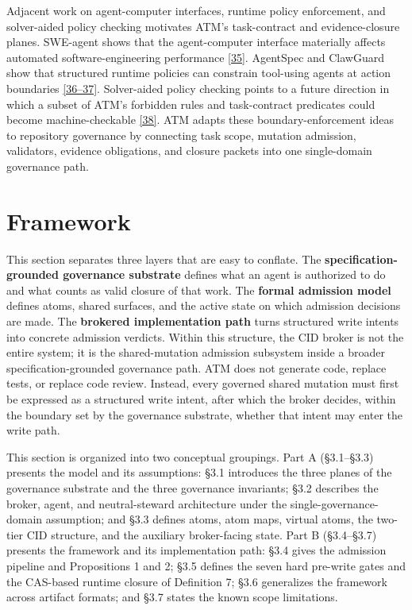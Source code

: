 \documentclass[9pt,letterpaper]{extarticle}
\begin{document}
Adjacent work on agent-computer interfaces, runtime policy enforcement, and solver-aided policy checking motivates ATM's task-contract and evidence-closure planes. SWE-agent shows that the agent-computer interface materially affects automated software-engineering performance \textcolor{atmLinkBlue}{\hyperlink{Item.71}{[35]}}. AgentSpec and ClawGuard show that structured runtime policies can constrain tool-using agents at action boundaries \textcolor{atmLinkBlue}{\hyperlink{Item.72}{[36--37]}}. Solver-aided policy checking points to a future direction in which a subset of ATM's forbidden rules and task-contract predicates could become machine-checkable \textcolor{atmLinkBlue}{\hyperlink{Item.74}{[38]}}. ATM adapts these boundary-enforcement ideas to repository governance by connecting task scope, mutation admission, validators, evidence obligations, and closure packets into one single-domain governance path.

\section{Framework}

This section separates three layers that are easy to conflate. The \textbf{specification-grounded governance substrate} defines what an agent is authorized to do and what counts as valid closure of that work. The \textbf{formal admission model} defines atoms, shared surfaces, and the active state on which admission decisions are made. The \textbf{brokered implementation path} turns structured write intents into concrete admission verdicts. Within this structure, the CID broker is not the entire system; it is the shared-mutation admission subsystem inside a broader specification-grounded governance path. ATM does not generate code, replace tests, or replace code review. Instead, every governed shared mutation must first be expressed as a structured write intent, after which the broker decides, within the boundary set by the governance substrate, whether that intent may enter the write path.

This section is organized into two conceptual groupings. Part A (§3.1--§3.3) presents the model and its assumptions: §3.1 introduces the three planes of the governance substrate and the three governance invariants; §3.2 describes the broker, agent, and neutral-steward architecture under the single-governance-domain assumption; and §3.3 defines atoms, atom maps, virtual atoms, the two-tier CID structure, and the auxiliary broker-facing state. Part B (§3.4--§3.7) presents the framework and its implementation path: §3.4 gives the admission pipeline and Propositions 1 and 2; §3.5 defines the seven hard pre-write gates and the CAS-based runtime closure of Definition 7; §3.6 generalizes the framework across artifact formats; and §3.7 states the known scope limitations.
\end{document}

